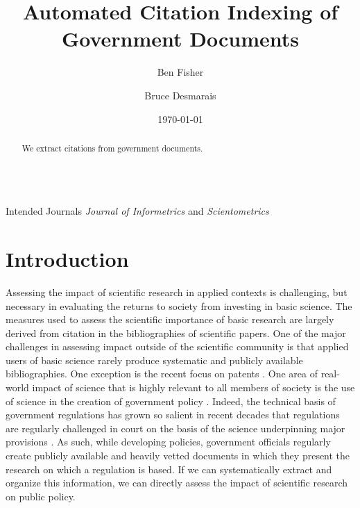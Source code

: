 \documentclass[12pt]{article}
\title{\vspace{-2cm} Automated Citation Indexing of Government Documents}
\author{ Ben Fisher \and Bruce Desmarais} \date{\today}
\begin{document}
\maketitle


\begin{abstract}

 \noindent  We extract citations from government documents. \\~\\

\end{abstract}

Intended Journals {\em Journal of Informetrics} and {\em Scientometrics}

\thispagestyle{empty}
\newpage
\doublespacing


\section{Introduction}
Assessing the impact of scientific research in applied contexts is challenging, but necessary in evaluating the returns to society from investing in basic science. The measures used to assess the scientific importance of basic research are largely derived from citation in the bibliographies of scientific papers. One of the major challenges in assessing impact outside of the scientific community is that applied users of basic science rarely produce systematic and publicly available bibliographies. One exception is the recent focus on patents \cite{huang2014,liaw2014,huang2015,wong2015}. One area of real-world impact of science that is highly relevant to all members of society is the use of science in the creation of government policy \cite{nrc2012}. Indeed, the technical basis of government regulations has grown so salient in recent decades that regulations are regularly challenged in court on the basis of the science underpinning major provisions \cite{ellig2013,morrall2014}. As such, while developing policies, government officials regularly create publicly available and heavily vetted documents in which they present the research on which a regulation is based. If we can systematically extract and organize this information, we can directly assess the impact of scientific research on public policy.
\end{document}
